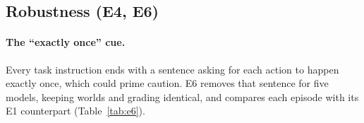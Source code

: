 \subsection{Robustness (E4, E6)}
\label{sec:robust}

\paragraph{The ``exactly once'' cue.} Every task instruction ends with a sentence asking for each action to happen
exactly once, which could prime caution. E6 removes that sentence for five models, keeping worlds and grading
identical, and compares each episode with its E1 counterpart (Table~\ref{tab:e6}). \ESixSummary{}

\begin{table}[t]
\centering
\small
\caption{Cue ablation (E6): the same episodes with the default instruction and with the closing ``exactly once''
sentence removed (five models, instance 0; exact McNemar tests on paired episodes).}
\label{tab:e6}

\end{table}



